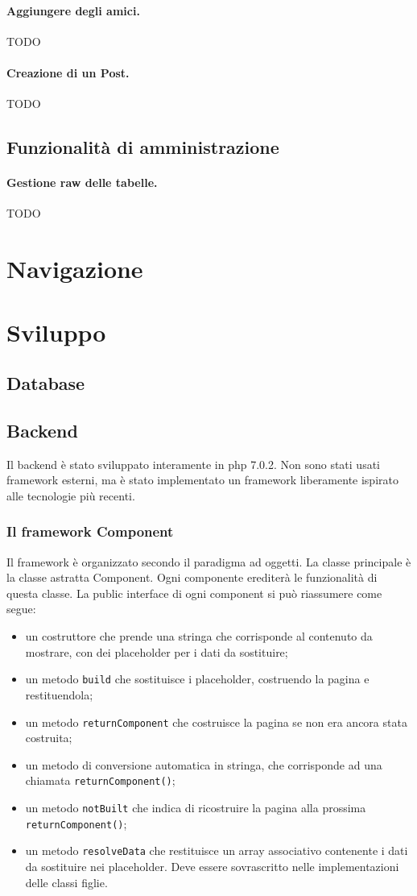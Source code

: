 \documentclass[12pt, a4paper]{article}
\begin{document}
\paragraph{Aggiungere degli amici.} TODO
\paragraph{Creazione di un Post.} TODO
\subsection{Funzionalità di amministrazione}
\paragraph{Gestione raw delle tabelle.} TODO

\section{Navigazione}

\section{Sviluppo}
\subsection{Database}
\subsection{Backend}
Il backend è stato sviluppato interamente in php 7.0.2. Non sono stati usati framework esterni, ma è stato implementato un framework liberamente ispirato alle tecnologie più recenti. 
\subsubsection{Il framework Component}
Il framework è organizzato secondo il paradigma ad oggetti. La classe principale è la classe astratta Component. Ogni componente erediterà le funzionalità di questa classe. La public interface di ogni component si può riassumere come segue:
\begin{itemize}
\item un costruttore che prende una stringa che corrisponde al contenuto da mostrare, con dei placeholder per i dati da sostituire;
\item un metodo \texttt{build} che sostituisce i placeholder, costruendo la pagina e restituendola;
\item un metodo \texttt{returnComponent} che costruisce la pagina se non era ancora stata costruita;
\item un metodo di conversione automatica in stringa, che corrisponde ad una chiamata \texttt{returnComponent()};
\item un metodo \texttt{notBuilt} che indica di ricostruire la pagina alla prossima \texttt{returnComponent()};
\item un metodo \texttt{resolveData} che restituisce un array associativo contenente i dati da sostituire nei placeholder. Deve essere sovrascritto nelle implementazioni delle classi figlie.
\end{itemize}
\end{document}
